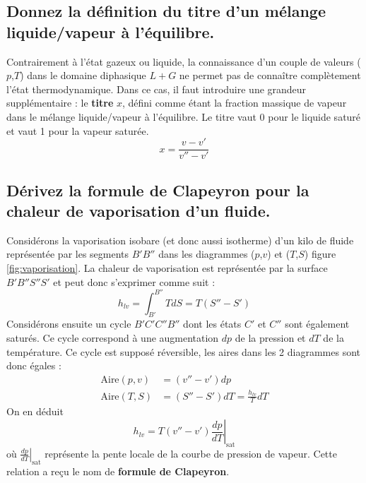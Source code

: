 \subsection{Donnez la définition du titre d'un mélange liquide/vapeur à l'équilibre.}
Contrairement à l'état gazeux ou liquide, la connaissance d'un couple de valeurs ($p$,$T$) dans le domaine diphasique $L+G$ ne permet pas de connaître complètement l'état thermodynamique. Dans ce cas, il faut introduire une grandeur supplémentaire : le \textbf{titre} $x$, défini comme étant la fraction massique de vapeur dans le mélange liquide/vapeur à l'équilibre. Le titre vaut 0 pour le liquide saturé et vaut 1 pour la vapeur saturée.
\begin{equation} x = \frac{v-v'}{v''-v'} \end{equation}

\subsection{Dérivez la formule de Clapeyron pour la chaleur de vaporisation d'un fluide.\label{q:59}}
Considérons la vaporisation isobare (et donc aussi isotherme) d'un kilo de fluide représentée par les segments $B'B''$ dans les diagrammes ($p$,$v$) et ($T$,$S$) figure \ref{fig:vaporisation}. La chaleur de vaporisation est représentée par la surface $B'B''S''S'$ et peut donc s'exprimer comme suit :
\begin{equation} h_{lv} = \int_{B'}^{B''}TdS = T(S''-S') \end{equation}
Considérons ensuite un cycle $B'C'C''B''$ dont les états $C'$ et $C''$ sont également saturés. Ce cycle correspond à une augmentation $dp$ de la pression et $dT$ de la température. Ce cycle est supposé réversible, les aires dans les 2 diagrammes sont donc égales :
\begin{align} \text{Aire}(p,v) &= (v''-v')dp \\ \text{Aire}(T,S) &= (S''-S')dT = \frac{h_{lv}}{T}dT \end{align}
On en déduit 
\begin{equation} h_{lv} = T(v''-v')\left.\frac{dp}{dT}\right|_\text{sat} \end{equation}
où $\left.\frac{dp}{dT}\right|_\text{sat}$ représente la pente locale de la courbe de pression de vapeur. Cette relation a reçu le nom de \textbf{formule de Clapeyron}.
